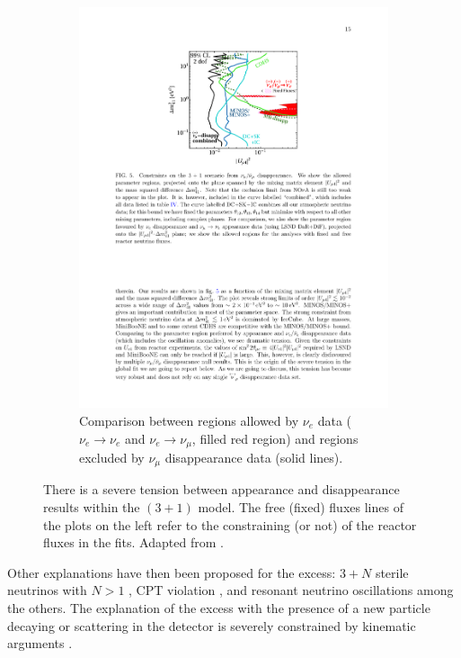 \begin{figure}[htbp]
\begin{subfigure}{0.48\textwidth}
\begin{center}
    \includegraphics[width=\linewidth]{figures/nuenumu.pdf}
    \caption{Comparison between regions allowed by $\nu_e$ data ($\nu_e\rightarrow\nu_e$ and $\nu_e\rightarrow\nu_{\mu}$, filled red region) and regions excluded by $\nu_{\mu}$ disappearance data (solid lines).}\label{fig:nue_vs_numu}
    \end{center}
  \end{subfigure}
  \caption{There is a severe tension between appearance and disappearance results within the $(3+1)$ model. The free (fixed) fluxes lines of the plots on the left refer to the constraining (or not) of the reactor fluxes in the fits. Adapted from \cite{Dentler:2018sju}.}
\end{figure}

Other explanations have then been proposed for the excess: $3+N$ sterile neutrinos with $N>1$ \cite{Conrad:2012qt}, CPT violation \cite{Kostelecky:2011gq}, and resonant neutrino oscillations \cite{Asaadi:2017bhx} among the others. The explanation of the excess with the presence of a new particle decaying or scattering in the detector is severely constrained by kinematic arguments \cite{Jordan:2018qiy}.

